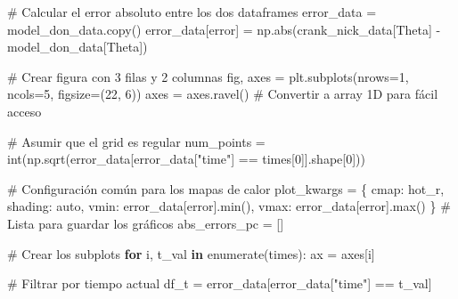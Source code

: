 \documentclass[
  spanish,
  us-letterpaper,
  DIV=11,
  numbers=noendperiod]{scrreprt}
\newenvironment{Shaded}{\begin{snugshade}}{\end{snugshade}}
\newcommand{\BuiltInTok}[1]{\textcolor[rgb]{0.00,0.23,0.31}{#1}}
\newcommand{\CommentTok}[1]{\textcolor[rgb]{0.37,0.37,0.37}{#1}}
\newcommand{\ControlFlowTok}[1]{\textcolor[rgb]{0.00,0.23,0.31}{\textbf{#1}}}
\newcommand{\DecValTok}[1]{\textcolor[rgb]{0.68,0.00,0.00}{#1}}
\newcommand{\KeywordTok}[1]{\textcolor[rgb]{0.00,0.23,0.31}{\textbf{#1}}}
\newcommand{\NormalTok}[1]{\textcolor[rgb]{0.00,0.23,0.31}{#1}}
\newcommand{\OperatorTok}[1]{\textcolor[rgb]{0.37,0.37,0.37}{#1}}
\newcommand{\StringTok}[1]{\textcolor[rgb]{0.13,0.47,0.30}{#1}}
\theoremstyle{plain}
\theoremstyle{definition}
\theoremstyle{remark}
\begin{document}
\begin{Shaded}
\begin{Highlighting}[]
\CommentTok{\# Calcular el error absoluto entre los dos dataframes}
\NormalTok{error\_data }\OperatorTok{=}\NormalTok{ model\_don\_data.copy()}
\NormalTok{error\_data[}\StringTok{\textquotesingle{}error\textquotesingle{}}\NormalTok{] }\OperatorTok{=}\NormalTok{ np.}\BuiltInTok{abs}\NormalTok{(crank\_nick\_data[}\StringTok{\textquotesingle{}Theta\textquotesingle{}}\NormalTok{] }\OperatorTok{{-}}\NormalTok{ model\_don\_data[}\StringTok{\textquotesingle{}Theta\textquotesingle{}}\NormalTok{])}

\CommentTok{\# Crear figura con 3 filas y 2 columnas}
\NormalTok{fig, axes }\OperatorTok{=}\NormalTok{ plt.subplots(nrows}\OperatorTok{=}\DecValTok{1}\NormalTok{, ncols}\OperatorTok{=}\DecValTok{5}\NormalTok{, figsize}\OperatorTok{=}\NormalTok{(}\DecValTok{22}\NormalTok{, }\DecValTok{6}\NormalTok{))}
\NormalTok{axes }\OperatorTok{=}\NormalTok{ axes.ravel()  }\CommentTok{\# Convertir a array 1D para fácil acceso}

\CommentTok{\# Asumir que el grid es regular}
\NormalTok{num\_points }\OperatorTok{=} \BuiltInTok{int}\NormalTok{(np.sqrt(error\_data[error\_data[}\StringTok{"time"}\NormalTok{] }\OperatorTok{==}\NormalTok{ times[}\DecValTok{0}\NormalTok{]].shape[}\DecValTok{0}\NormalTok{]))}

\CommentTok{\# Configuración común para los mapas de calor}
\NormalTok{plot\_kwargs }\OperatorTok{=}\NormalTok{ \{}
    \StringTok{\textquotesingle{}cmap\textquotesingle{}}\NormalTok{: }\StringTok{\textquotesingle{}hot\_r\textquotesingle{}}\NormalTok{,}
    \StringTok{\textquotesingle{}shading\textquotesingle{}}\NormalTok{: }\StringTok{\textquotesingle{}auto\textquotesingle{}}\NormalTok{,}
    \StringTok{\textquotesingle{}vmin\textquotesingle{}}\NormalTok{: error\_data[}\StringTok{\textquotesingle{}error\textquotesingle{}}\NormalTok{].}\BuiltInTok{min}\NormalTok{(),}
    \StringTok{\textquotesingle{}vmax\textquotesingle{}}\NormalTok{: error\_data[}\StringTok{\textquotesingle{}error\textquotesingle{}}\NormalTok{].}\BuiltInTok{max}\NormalTok{()}
\NormalTok{\}}
\CommentTok{\# Lista para guardar los gráficos}
\NormalTok{abs\_errors\_pc }\OperatorTok{=}\NormalTok{ []}

\CommentTok{\# Crear los subplots}
\ControlFlowTok{for}\NormalTok{ i, t\_val }\KeywordTok{in} \BuiltInTok{enumerate}\NormalTok{(times):}
\NormalTok{    ax }\OperatorTok{=}\NormalTok{ axes[i]}
    
    \CommentTok{\# Filtrar por tiempo actual}
\NormalTok{    df\_t }\OperatorTok{=}\NormalTok{ error\_data[error\_data[}\StringTok{"time"}\NormalTok{] }\OperatorTok{==}\NormalTok{ t\_val]}
    

\end{Highlighting}
\end{Shaded}
\end{document}
